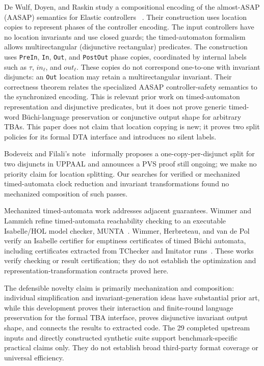 De Wulf, Doyen, and Raskin study a compositional encoding of the
almost-ASAP (AASAP) semantics for Elastic controllers
~\cite{de_wulf_doyen_raskin_fm2005}. Their construction uses location copies
to represent phases of the controller encoding. The input controllers have no location
invariants and use closed guards; the timed-automaton formalism allows
multirectangular (disjunctive rectangular) predicates.
The construction uses \texttt{PreIn}, \texttt{In}, \texttt{Out}, and
\texttt{PostOut} phase copies, coordinated by internal labels such as
$\tau$, $\mathit{in}_\ell$, and $\mathit{out}_\ell$. These copies do not
correspond one-to-one with invariant disjuncts: an \texttt{Out} location may
retain a multirectangular invariant. Their correctness theorem relates the
specialized AASAP controller-safety semantics to the synchronized encoding.
This is relevant prior work on timed-automaton representation and disjunctive
predicates, but it does not prove generic timed-word Büchi-language
preservation or conjunctive output shape for arbitrary TBAs. This paper does not
claim that location copying is new; it proves two split policies for its
formal DTA interface and introduces no silent labels.

Bodeveix and Filali's note~\cite{[BF03]} informally proposes a
one-copy-per-disjunct split for two disjuncts in UPPAAL and announces a PVS
proof still ongoing; we make no priority claim for location splitting. Our searches for verified or
mechanized timed-automata clock reduction and invariant transformations found
no mechanized composition of such passes.

Mechanized timed-automata work addresses adjacent guarantees. Wimmer and
Lammich refine timed-automata reachability checking to an executable
Isabelle/HOL model checker, MUNTA~\cite{munta_tacas18,munta_formats19}.
Wimmer, Herbreteau, and van de Pol verify an Isabelle certifier for emptiness
certificates of timed B\"uchi automata, including certificates extracted
from TChecker and Imitator runs~\cite{wimmer_herbreteau_vandepol_formats2020}.
These works verify checking or result certification; they do not establish
the optimization and representation-transformation contracts proved here.




The defensible novelty claim is primarily mechanization and composition:
individual simplification and invariant-generation ideas have substantial
prior art, while this development proves their interaction and finite-round
language preservation for the formal TBA interface, proves disjunctive
invariant output shape, and connects the results to extracted code. The
29 completed upstream inputs and directly constructed synthetic suite
support benchmark-specific practical claims only. They do not establish
broad third-party format coverage or universal efficiency.
